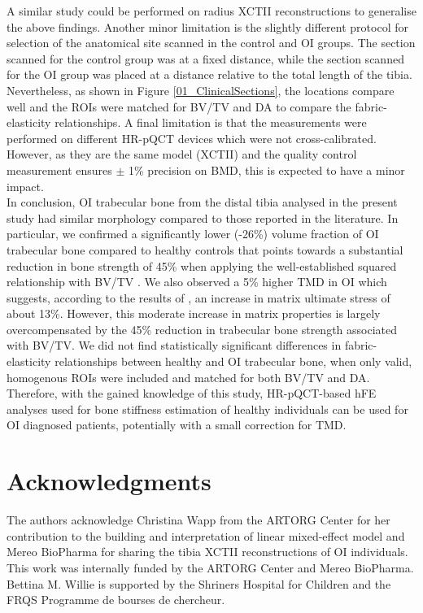 \documentclass[a4paper,fleqn]{DC_ArtStyle}
\begin{document}
	A similar study could be performed on radius XCTII reconstructions to generalise the above findings. Another minor limitation is the slightly different protocol for selection of the anatomical site scanned in the control and OI groups. The section scanned for the control group was at a fixed distance, while the section scanned for the OI group was placed at a distance relative to the total length of the tibia. Nevertheless, as shown in Figure \ref{01_ClinicalSections}, the locations compare well and the ROIs were matched for BV/TV and DA to compare the fabric-elas\-ticity relationships. A final limitation is that the measurements were performed on different HR-pQCT devices which were not cross-calibrated. However, as they are the same model (XCTII) and the quality control measurement ensures $\pm$ 1\% precision on BMD, this is expected to have a minor impact. \\
	
	In conclusion, OI trabecular bone from the distal tibia analysed in the present study had similar morphology compared to those reported in the literature. In particular, we confirmed a significantly lower (-26\%) volume fraction of OI trabecular bone compared to healthy controls that points towards a substantial reduction in bone strength of 45\% when applying the well-established squared relationship with BV/\-TV \cite{Fleps2020}. 
	We also observed a 5\% higher TMD in OI %
	which suggests, according to the results of \citeauthor{Indermaur2021}\cite{Indermaur2021}, an increase in matrix ultimate stress of about 13\%. %
	However, this moderate increase in matrix properties is large\-ly overcompensated by the 45\% reduction in trabecular bone strength associated with BV/TV. %
	We did not find statistically significant differences in fabric-elasticity relationships between healthy and OI trabecular bone, when only valid, homogenous ROIs were included and matched for both BV/TV and DA. Therefore, with the gained knowledge of this study, HR-pQCT-based hFE analyses used for bone stiffness estimation of healthy individuals can be used for OI diagnosed patients, potentially with a small correction for TMD.

	
	\section*{Acknowledgments}
	The authors acknowledge Christina Wapp from the ARTORG Center for her contribution to the building and interpretation of linear mixed-effect model and Mereo BioPharma for sharing the tibia XCTII reconstructions of OI individuals. This work was internally funded by the ARTORG Center and Mereo BioPharma.  Bettina M. Willie is supported by the Shriners Hospital for Children and the FRQS Programme de bourses de chercheur. 
	
\end{document}
